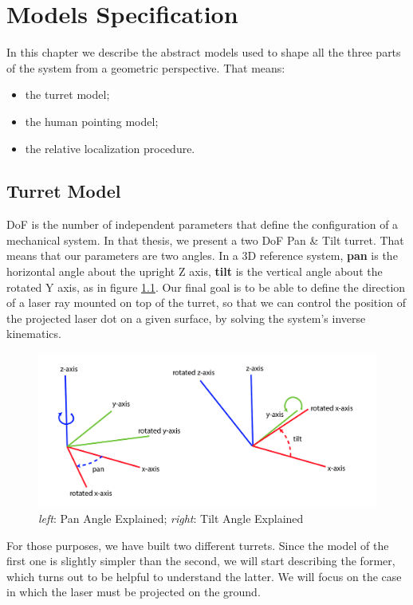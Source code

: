 \chapter{Models Specification}
\label{chap:1} 
In this chapter we describe the abstract models used to shape all the three parts of the system from a geometric perspective. That means:
\begin{itemize}
    \item the turret model;
    \item the human pointing model;
    \item the relative localization procedure.
\end{itemize}
\section{Turret Model}
\label{sec:1.1}
\ac{DoF} is the number of independent parameters that define the configuration of a mechanical system. In that thesis, we present a two \ac{DoF} Pan \& Tilt turret. That means that our parameters are two angles. In a 3D reference system, \textbf{pan} is the horizontal angle about the upright Z axis, \textbf{tilt} is the vertical angle about the rotated Y axis, as in figure \ref{fig:panTilt}.
Our final goal is to be able to define the direction of a laser ray mounted on top of the turret, so that we can control the position of the projected laser dot on a given surface, by solving the system's inverse kinematics.\\
\begin{figure}
	\centering
	\includegraphics[width=\textwidth]{img/panTilt.png}%
	\caption[Pan and Tilt Angles Explained]{\emph{left}: Pan Angle Explained; \emph{right}: Tilt Angle Explained}
	\label{fig:panTilt}
\end{figure}
For those purposes, we have built two different turrets. Since the model of the first one is slightly simpler than the second, we will start describing the former, which turns out to be helpful to understand the latter. We will focus on the case in which the laser must be projected on the ground.

